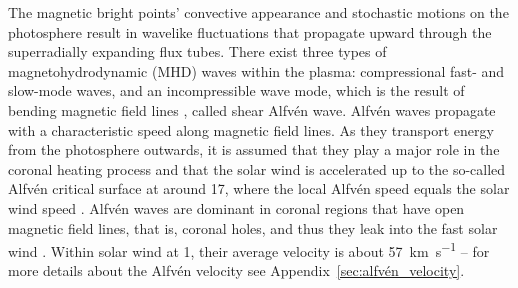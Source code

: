 \begin{figure}[htb]
\end{figure}

The magnetic bright points' convective appearance and stochastic motions on the photosphere result in wavelike fluctuations that propagate upward through the superradially expanding flux tubes. There exist three types of magnetohydrodynamic (MHD) waves within the plasma: compressional fast- and slow-mode waves, and an incompressible wave mode, which is the result of bending magnetic field lines \citep{Alfven1942}, called shear Alfvén wave. Alfvén waves propagate with a characteristic speed along magnetic field lines. As they transport energy from the photosphere outwards, it is assumed that they play a major role in the coronal heating process and that the solar wind is accelerated up to the so-called Alfvén critical surface at around \SI{17}{\Rs}, where the local Alfvén speed equals the solar wind speed \citep{Sittler1999,Exarhos2000}. Alfvén waves are dominant in coronal regions that have open magnetic field lines, that is, coronal holes, and thus they leak into the fast solar wind \citep{Cranmer2005}. Within solar wind at \SI{1}{\au}, their average velocity is about \SI{57}{\km\per\s} \citep{Veselovsky2010} -- for more details about the Alfvén velocity see Appendix~\ref{sec:alfvén_velocity}.

